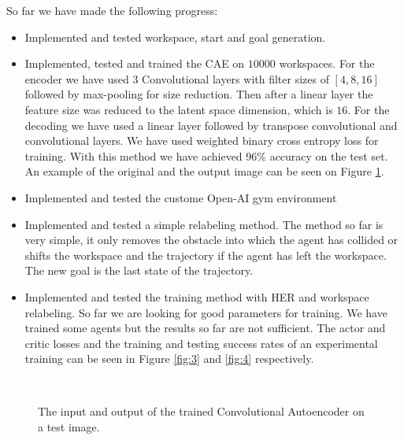 \documentclass[conference]{IEEEtran}
\begin{document}
So far we have made the following progress:
\begin{itemize}
	\item Implemented and tested workspace, start and goal generation.
	\item Implemented, tested and trained the CAE on $10000$ workspaces. For the encoder we have used 3 Convolutional layers with filter sizes of $[4, 8, 16]$ followed by max-pooling for size reduction. Then after a linear layer the feature size was reduced to the latent space dimension, which is $16$. For the decoding we have used a linear layer followed by transpose convolutional and convolutional layers. We have used weighted binary cross entropy loss for training. With this method we have achieved $96\%$ accuracy on the test set. An example of the original and the output image can be seen on Figure \ref{fig:2}.
	\item Implemented and tested the custome Open-AI gym environment
	\item Implemented and tested a simple relabeling method. The method so far is very simple, it only removes the obstacle into which the agent has collided or shifts the workspace and the trajectory if the agent has left the workspace. The new goal is the last state of the trajectory.
	\item Implemented and tested the training method with HER and workspace relabeling. So far we are looking for good parameters for training. We have trained some agents but the results so far are not sufficient. The actor and critic losses and the training and testing success rates of an experimental training can be seen in Figure \ref{fig:3} and \ref{fig:4} respectively.
\end{itemize}

\begin{figure}[h!]
	\begin{center}
		~
	\end{center}
	\vspace{-4mm}
	\caption{The input and output of the trained Convolutional Autoencoder on a test image.}
	\label{fig:2}
	\vspace{-0mm}
\end{figure}
\end{document}
